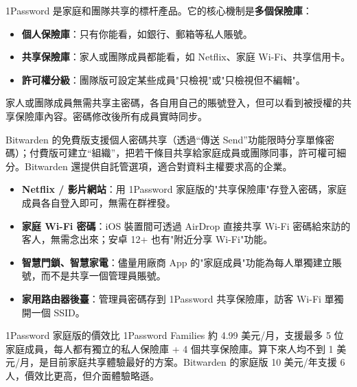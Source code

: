 
1Password 是家庭和團隊共享的標杆產品。它的核心機制是\textbf{多個保險庫}：

\begin{itemize}
  \item \textbf{個人保險庫}：只有你能看，如銀行、郵箱等私人賬號。
  \item \textbf{共享保險庫}：家人或團隊成員都能看，如 Netflix、家庭 Wi-Fi、共享信用卡。
  \item \textbf{許可權分級}：團隊版可設定某些成員"只檢視"或"只檢視但不編輯"。
\end{itemize}

家人或團隊成員無需共享主密碼，各自用自己的賬號登入，但可以看到被授權的共享保險庫內容。密碼修改後所有成員實時同步。


Bitwarden 的免費版支援個人密碼共享（透過“傳送 Send”功能限時分享單條密碼）；付費版可建立“組織”，把若干條目共享給家庭成員或團隊同事，許可權可細分。Bitwarden 還提供自託管選項，適合對資料主權要求高的企業。


\begin{itemize}
  \item \textbf{Netflix / 影片網站}：用 1Password 家庭版的"共享保險庫"存登入密碼，家庭成員各自登入即可，無需在群裡發。
  \item \textbf{家庭 Wi-Fi 密碼}：iOS 裝置間可透過 AirDrop 直接共享 Wi-Fi 密碼給來訪的客人，無需念出來；安卓 12+ 也有"附近分享 Wi-Fi"功能。
  \item \textbf{智慧門鎖、智慧家電}：儘量用廠商 App 的"家庭成員"功能為每人單獨建立賬號，而不是共享一個管理員賬號。
  \item \textbf{家用路由器後臺}：管理員密碼存到 1Password 共享保險庫，訪客 Wi-Fi 單獨開一個 SSID。
\end{itemize}

\begin{tcbinfo}{1Password 家庭版的價效比}
1Password Families 約 4.99 美元/月，支援最多 5 位家庭成員，每人都有獨立的私人保險庫 + 4 個共享保險庫。算下來人均不到 1 美元/月，是目前家庭共享體驗最好的方案。Bitwarden 的家庭版 10 美元/年支援 6 人，價效比更高，但介面體驗略遜。

\end{tcbinfo}


